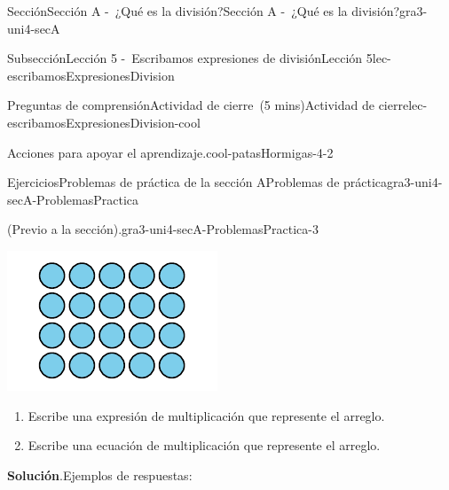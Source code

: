 \documentclass[oneside,10pt,]{article}
\newcommand{\blocktitlefont}{\relax}
\begin{document}
\begin{sectionptx}{Sección}{Sección A -~¿Qué es la división?}{}{Sección A -~¿Qué es la división?}{}{}{gra3-uni4-secA}
\begin{subsectionptx}{Subsección}{Lección 5 -~Escribamos expresiones de división}{}{Lección 5}{}{}{lec-escribamosExpresionesDivision}
\begin{reading-questions-subsubsection}{Preguntas de comprensión}{Actividad de cierre~(5 mins)}{}{Actividad de cierre}{}{}{lec-escribamosExpresionesDivision-cool}
\begin{paragraphs}{Acciones para apoyar el aprendizaje.}{cool-patasHormigas-4-2}
\end{paragraphs}%
\end{reading-questions-subsubsection}
\end{subsectionptx}
%
%
\typeout{************************************************}
\typeout{************************************************}
%
\begin{exercises-subsection}{Ejercicios}{Problemas de práctica de la sección A}{}{Problemas de práctica}{}{}{gra3-uni4-secA-ProblemasPractica}
\begin{divisionexercise}{1}{(Previo a la sección).}{}{gra3-uni4-secA-ProblemasPractica-3}%
\begin{sidebyside}{2}{0}{0}{0}%
\begin{sbspanel}{0.3}%
\includegraphics[width=\linewidth]{external/svg-source/tikz-file-151668.pdf}
\end{sbspanel}%
\begin{sbspanel}{0.7}%
%
\begin{enumerate}[label={(\alph*)}]
\item{}Escribe una expresión de multiplicación que represente el arreglo.%
\item{}Escribe una ecuación de multiplicación que represente el arreglo.%
\end{enumerate}
%
\end{sbspanel}%
\end{sidebyside}%
\par\smallskip%
\noindent\textbf{\blocktitlefont Solución}.\hypertarget{gra3-uni4-secA-ProblemasPractica-3-3}{}\quad{}Ejemplos de respuestas:%
%
\begin{enumerate}[label={(\alph*)}]

\end{enumerate}
\end{divisionexercise}
\end{exercises-subsection}
\end{sectionptx}
\end{document}
